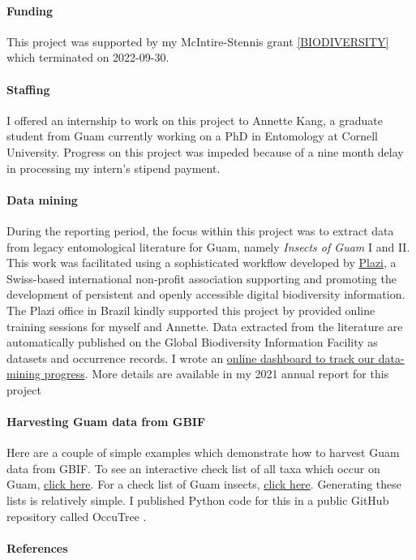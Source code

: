 \begin{refsection}
	\paragraph{Funding} This project was supported by my McIntire-Stennis grant \ref{BIODIVERSITY} which terminated on 2022-09-30.
	
	\paragraph{Staffing} I offered an internship to work on this project to Annette Kang, a graduate student from Guam currently working on a PhD in Entomology at Cornell University. Progress on this project was impeded because of a nine month delay in processing my intern's stipend payment.  	
	
	\paragraph{Data mining} During the reporting period, the focus within this project was to extract data from legacy entomological literature for Guam, namely \textit{Insects of Guam} I and II. This work was facilitated using a sophisticated workflow developed by \href{https://en.wikipedia.org/wiki/Plazi}{Plazi}, a Swiss-based international non-profit association supporting and promoting the development of persistent and openly accessible digital biodiversity information. The Plazi office in Brazil kindly supported this project by provided online training sessions for myself and Annette. Data extracted from the literature are automatically published on the Global Biodiversity Information Facility as datasets and occurrence records. I wrote an \href{https://aubreymoore.github.io/data-mining-insects-of-guam/validator2/status_report.html}{online dashboard to track our data-mining progress}. More details are available in my 2021 annual report for this project \cite{moore_guam_2021}
	
	\paragraph{Harvesting Guam data from GBIF}
	
	Here are a couple of simple examples which demonstrate how to harvest Guam data from GBIF. 
	To see an interactive check list of all taxa which occur on Guam, 
	\href{https://aubreymoore.github.io/OccuTree/gbif-occurrences-Guam.html}{click here}. 
	For a check list of Guam insects, 
	\href{https://aubreymoore.github.io/OccuTree/gbif-occurrences-Guam-Insecta.html}{click here}. 
	Generating these lists is relatively simple. I published Python code for this in a public GitHub repository called OccuTree \cite{mooreGitHubRepositoryOccuTree2023}.
	
	\paragraph{References}
	\printbibliography[heading=none]
\end{refsection}


